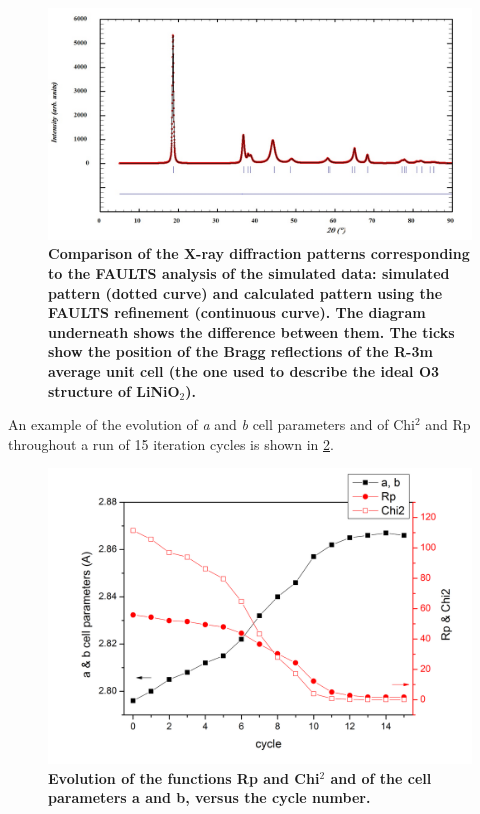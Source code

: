 \begin{figure}
\begin{center}
\includegraphics [width=6 in]{pattern.jpg}
\caption{\bf Comparison of the X-ray diffraction patterns corresponding to the FAULTS analysis of the simulated data: simulated pattern (dotted curve) and calculated pattern using the FAULTS refinement (continuous curve). The diagram underneath shows the difference between them. The ticks show the position of the Bragg reflections of the R-3m average unit cell (the one used to describe the ideal O3 structure of LiNiO$_{2}$).  }
\label{sim}
\end{center}
\end{figure}

An example of the evolution of \textit{a} and \textit{b} cell parameters and of Chi$^{2}$ and Rp throughout a run of 15 iteration cycles is shown in \ref{cycles}.

\begin{figure}[!htbp]
\begin{center}
\includegraphics [width=4 in]{chi2_Rf.jpg}
\caption{\bf Evolution of the functions Rp and Chi$^{2}$ and of the cell parameters a and b, versus the cycle number. }
\label{cycles}
\end{center}
\end{figure}
